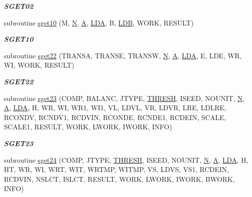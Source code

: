 \begin{DoxyCompactItemize}
\begin{DoxyCompactList}\small\item\em {\bfseries S\+G\+E\+T02} \end{DoxyCompactList}\item 
subroutine \hyperlink{group__single__eig_ga0e9e61f3b94abf4f82b4f53f382e11dc}{sget10} (M, \hyperlink{polmisc_8c_a0240ac851181b84ac374872dc5434ee4}{N}, \hyperlink{classA}{A}, \hyperlink{example__user_8c_ae946da542ce0db94dced19b2ecefd1aa}{L\+D\+A}, B, \hyperlink{example__user_8c_a50e90a7104df172b5a89a06c47fcca04}{L\+D\+B}, W\+O\+R\+K, R\+E\+S\+U\+L\+T)
\begin{DoxyCompactList}\small\item\em {\bfseries S\+G\+E\+T10} \end{DoxyCompactList}\item 
subroutine \hyperlink{group__single__eig_ga2a7d9603b3bd0ebb820f3a0ed88d760a}{sget22} (T\+R\+A\+N\+S\+A, T\+R\+A\+N\+S\+E, T\+R\+A\+N\+S\+W, \hyperlink{polmisc_8c_a0240ac851181b84ac374872dc5434ee4}{N}, \hyperlink{classA}{A}, \hyperlink{example__user_8c_ae946da542ce0db94dced19b2ecefd1aa}{L\+D\+A}, E, L\+D\+E, W\+R, W\+I, W\+O\+R\+K, R\+E\+S\+U\+L\+T)
\begin{DoxyCompactList}\small\item\em {\bfseries S\+G\+E\+T22} \end{DoxyCompactList}\item 
subroutine \hyperlink{group__single__eig_gade26c43e6d095c1129bdadb44e996089}{sget23} (C\+O\+M\+P, B\+A\+L\+A\+N\+C, J\+T\+Y\+P\+E, \hyperlink{zlaqgs_8c_a0656018abfc9fa2821827415f5d5ea57}{T\+H\+R\+E\+S\+H}, I\+S\+E\+E\+D, N\+O\+U\+N\+I\+T, \hyperlink{polmisc_8c_a0240ac851181b84ac374872dc5434ee4}{N}, \hyperlink{classA}{A}, \hyperlink{example__user_8c_ae946da542ce0db94dced19b2ecefd1aa}{L\+D\+A}, H, W\+R, W\+I, W\+R1, W\+I1, V\+L, L\+D\+V\+L, V\+R, L\+D\+V\+R, L\+R\+E, L\+D\+L\+R\+E, R\+C\+O\+N\+D\+V, R\+C\+N\+D\+V1, R\+C\+D\+V\+I\+N, R\+C\+O\+N\+D\+E, R\+C\+N\+D\+E1, R\+C\+D\+E\+I\+N, S\+C\+A\+L\+E, S\+C\+A\+L\+E1, R\+E\+S\+U\+L\+T, W\+O\+R\+K, L\+W\+O\+R\+K, I\+W\+O\+R\+K, I\+N\+F\+O)
\begin{DoxyCompactList}\small\item\em {\bfseries S\+G\+E\+T23} \end{DoxyCompactList}\item 
subroutine \hyperlink{group__single__eig_ga35b38ff82fbc9f1d0f4e0eba2f7c497f}{sget24} (C\+O\+M\+P, J\+T\+Y\+P\+E, \hyperlink{zlaqgs_8c_a0656018abfc9fa2821827415f5d5ea57}{T\+H\+R\+E\+S\+H}, I\+S\+E\+E\+D, N\+O\+U\+N\+I\+T, \hyperlink{polmisc_8c_a0240ac851181b84ac374872dc5434ee4}{N}, \hyperlink{classA}{A}, \hyperlink{example__user_8c_ae946da542ce0db94dced19b2ecefd1aa}{L\+D\+A}, H, H\+T, W\+R, W\+I, W\+R\+T, W\+I\+T, W\+R\+T\+M\+P, W\+I\+T\+M\+P, V\+S, L\+D\+V\+S, V\+S1, R\+C\+D\+E\+I\+N, R\+C\+D\+V\+I\+N, N\+S\+L\+C\+T, I\+S\+L\+C\+T, R\+E\+S\+U\+L\+T, W\+O\+R\+K, L\+W\+O\+R\+K, I\+W\+O\+R\+K, B\+W\+O\+R\+K, I\+N\+F\+O)

\end{DoxyCompactItemize}
